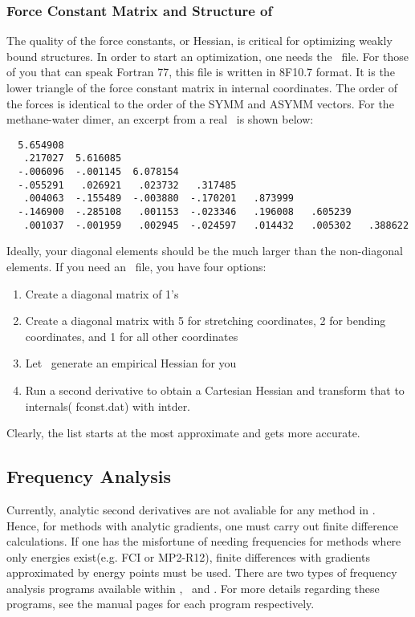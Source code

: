 \subsubsection{Force Constant Matrix and Structure of \fconstdat}
The quality of the force constants, or Hessian, is critical for
optimizing weakly bound structures. In order to start an optimization,
one needs the \fconstdat\ file. For those of you that can speak
Fortran 77, this file is written in 8F10.7 format. It is the
lower triangle of the force constant matrix in internal coordinates. The order
of the forces is identical to the order of the SYMM and ASYMM vectors.
For the methane-water dimer, an excerpt from a real \fconstdat\ is shown below: 
\begin{verbatim}
  5.654908
   .217027  5.616085
  -.006096  -.001145  6.078154
  -.055291   .026921   .023732   .317485
   .004063  -.155489  -.003880  -.170201   .873999
  -.146900  -.285108   .001153  -.023346   .196008   .605239
   .001037  -.001959   .002945  -.024597   .014432   .005302   .388622
\end{verbatim}
Ideally, your diagonal elements should be the much larger than
the non-diagonal elements. If you need an \fconstdat\ file, you have four options: 
\begin{enumerate}
\item Create a diagonal matrix of 1's 
\item Create a diagonal matrix with 5 for stretching coordinates,
2 for bending coordinates, and 1 for all other coordinates 
\item Let \PSIoptking\ generate an empirical Hessian for you
\item Run a second derivative to obtain a Cartesian Hessian
and transform that to internals( fconst.dat) with intder. 
\end{enumerate}
Clearly, the list starts at the most
approximate and gets more accurate. 

\subsection{Frequency Analysis}
Currently, analytic second derivatives are not avaliable for any
method in \PSIthree. Hence, for methods with analytic gradients,
one must carry out finite difference calculations. If one has the misfortune of needing frequencies
for methods where only energies exist(e.g. FCI or MP2-R12), finite
differences with gradients approximated by energy
points must be used. There are two types of frequency analysis
programs available within \PSIthree, \PSInormco\ and \PSIintder.
For more details regarding these programs, see the manual pages for each
program respectively.


